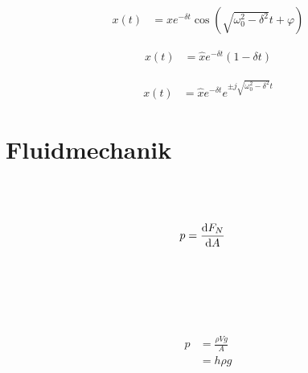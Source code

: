 \begin{boxleft}
\end{boxleft}\begin{boxrightshaded}
\begin{align}
x(t)&=\hat{x}e^{-\delta t}\cos(\sqrt{\omega_0^2-\delta^2}t+\varphi)
\end{align}
\end{boxrightshaded}

\begin{boxleft}
\end{boxleft}\begin{boxrightshaded}
\begin{align}
x(t)&=\hat{x}e^{-\delta t}(1-\delta t)
\end{align}
\end{boxrightshaded}

\begin{boxleft}
\end{boxleft}\begin{boxrightshaded}
\begin{align}
x(t)&=\hat{x}e^{-\delta t}e^{\pm j\sqrt{\omega_0^2-\delta^2}t}
\end{align}
\end{boxrightshaded}

\section{Fluidmechanik}

\begin{boxleft}
\\
\\
\end{boxleft}\begin{boxrightshaded}
\begin{align}
p&=\frac{\mathop{}\!\mathrm{d} F_N}{\mathop{}\!\mathrm{d} A}
\end{align}
\end{boxrightshaded}

\begin{boxleft}
\\
\\
\\
\\
\end{boxleft}\begin{boxrightshaded}
\begin{align}
p&=\frac{\rho V g}{A}\\
&=h\rho g
\end{align}
\end{boxrightshaded}

